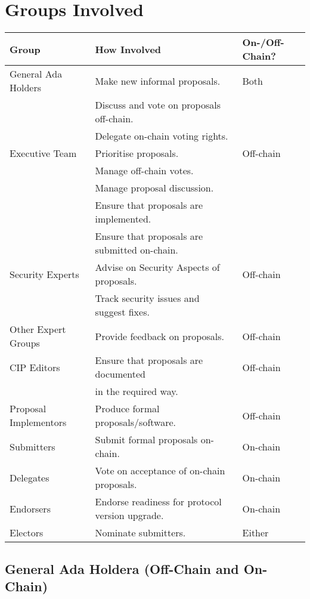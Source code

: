 \section{Groups Involved}

\begin{tabular}{||l|l|l||}
  \hline \hline
  \textbf{Group} & \textbf{How Involved} & \textbf{On-/Off-Chain?}\\
  \hline
  General Ada Holders  & Make new informal proposals. & Both \\
                       & Discuss and vote on proposals off-chain. & \\
  			               & Delegate on-chain voting rights. & \\
  \hline
  Executive Team  & Prioritise proposals. & Off-chain \\
                       & Manage off-chain votes. & \\
                       & Manage proposal discussion. & \\
  			               & Ensure that proposals are implemented. & \\
  			               & Ensure that proposals are submitted on-chain. & \\
  \hline
  Security Experts			       & Advise on Security Aspects of proposals. & Off-chain \\
                               & Track security issues and suggest fixes. & \\
  \hline
  Other Expert Groups			       & Provide feedback on proposals. & Off-chain \\
  \hline
  CIP Editors			   & Ensure that proposals are documented & Off-chain \\
                     & in the required way. &  \\
  \hline
  Proposal Implementors			   & Produce formal proposals/software. & Off-chain\\
  \hline
  Submitters				   & Submit formal proposals on-chain. & On-chain \\
  \hline
  Delegates				   & Vote on acceptance of on-chain proposals. & On-chain \\
  \hline
  Endorsers			   & Endorse readiness for protocol version upgrade. & On-chain\\
  \hline
  Electors			       & Nominate submitters. & Either \\
  \hline \hline
\end{tabular}

\subsection{General Ada Holdera (Off-Chain and On-Chain)}

